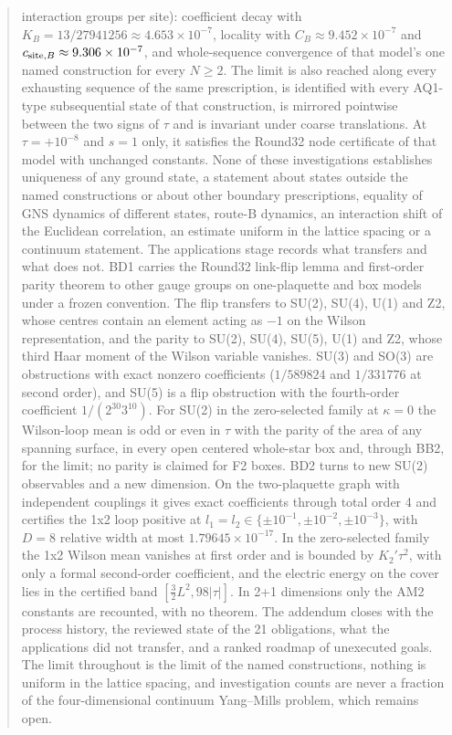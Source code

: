\documentclass[11pt,a4paper]{article}
\begin{document}
\begin{abstract}
interaction groups per site): coefficient decay with
$K_B=13/27941256\approx4.653\times10^{-7}$, locality with
$C_B\approx9.452\times10^{-7}$ and $c_{{\rm site},B}\approx9.306\times10^{-7}$,
and whole-sequence convergence of that model's one named construction for
every $N\ge2$. The limit is also reached along every exhausting sequence of
the same prescription, is identified with every AQ1-type subsequential state
of that construction, is mirrored pointwise between the two signs of $\tau$
and is invariant under coarse translations. At $\tau=+10^{-8}$ and $s=1$
only, it satisfies the Round32 node certificate of that model with unchanged
constants. None of these
investigations establishes uniqueness of any ground state, a statement about
states outside the named constructions or about other boundary
prescriptions, equality of GNS dynamics of different states, route-B
dynamics, an interaction shift of the Euclidean correlation, an estimate
uniform in the lattice spacing or a continuum statement. The applications
stage records what transfers and what does not. BD1 carries the Round32
link-flip lemma and first-order parity theorem to other gauge groups on
one-plaquette and box models under a frozen convention. The flip transfers
to SU(2), SU(4), U(1) and Z2, whose centres contain an element acting as $-1$
on the Wilson representation, and the parity to SU(2), SU(4), SU(5), U(1) and
Z2, whose third Haar moment of the Wilson variable vanishes. SU(3) and SO(3)
are obstructions with exact nonzero coefficients ($1/589824$ and $1/331776$
at second order), and SU(5) is a flip obstruction with the fourth-order
coefficient $1/(2^{30}3^{10})$. For SU(2) in the zero-selected family at
$\kappa=0$ the Wilson-loop mean is odd or even in $\tau$ with the parity of
the area of any spanning surface, in every open centered whole-star box
and, through BB2, for the limit; no parity is claimed for F2 boxes. BD2 turns to new SU(2) observables and a new
dimension. On the two-plaquette graph with independent couplings it gives
exact coefficients through total order 4 and certifies the 1x2 loop
positive at $l_1=l_2\in\{\pm10^{-1},\pm10^{-2},\pm10^{-3}\}$, with $D=8$
relative width at most $1.79645\times10^{-17}$. In the zero-selected family the 1x2 Wilson mean
vanishes at first order and is bounded by $K_2'\tau^2$, with only a formal
second-order coefficient, and the electric energy on the cover lies in the
certified band $[\tfrac32L^2,98|\tau|]$. In 2+1 dimensions only the AM2 constants
are recounted, with no theorem. The addendum closes with the process history,
the reviewed state of the 21 obligations, what the applications did not
transfer, and a ranked roadmap of unexecuted goals. The limit throughout is the
limit of the named constructions, nothing is uniform in the lattice spacing,
and investigation counts are never a fraction of the four-dimensional
continuum Yang--Mills problem, which remains open.
\end{abstract}
\end{document}
